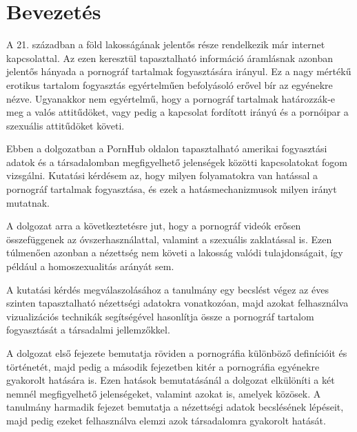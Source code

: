 \documentclass[12pt,a4paper]{article}
\begin{document}
\thispagestyle{empty}

\pagebreak

\tableofcontents

\thispagestyle{empty}

\pagebreak
\setcounter{page}{1}
\listoffigures


\pagebreak

\setcounter{tocdepth}{2}

\section{Bevezetés}

A 21. században a föld lakosságának jelentős része rendelkezik már internet kapcsolattal. Az ezen keresztül tapasztalható információ áramlásnak azonban jelentős hányada a pornográf tartalmak fogyasztására irányul. Ez a nagy mértékű erotikus tartalom fogyasztás egyértelműen befolyásoló erővel bír az egyénekre nézve. Ugyanakkor nem egyértelmű, hogy a pornográf tartalmak határozzák-e meg a valós attitűdöket, vagy pedig a kapcsolat fordított irányú és a pornóipar a szexuális attitűdöket követi.

Ebben a dolgozatban a PornHub oldalon tapasztalható amerikai fogyasztási adatok és a társadalomban megfigyelhető jelenségek közötti kapcsolatokat fogom vizsgálni. Kutatási kérdésem az, hogy milyen folyamatokra van hatással a pornográf tartalmak fogyasztása, és ezek a hatásmechanizmusok milyen irányt mutatnak.

A dolgozat arra a következtetésre jut, hogy a pornográf videók erősen összefüggenek az óvszerhasználattal, valamint a szexuális zaklatással is. Ezen túlmenően azonban a nézettség nem követi a lakosság valódi tulajdonságait, így például a homoszexualitás arányát sem.

A kutatási kérdés megválaszolásához a tanulmány egy becslést végez az éves szinten tapasztalható nézettségi adatokra vonatkozóan, majd azokat felhasználva vizualizációs technikák segítségével hasonlítja össze a pornográf tartalom fogyasztását a társadalmi jellemzőkkel.

A dolgozat első fejezete bemutatja röviden a pornográfia különböző definícióit és történetét, majd pedig a második fejezetben kitér a pornográfia egyénekre gyakorolt hatására is. Ezen hatások bemutatásánál a dolgozat elkülöníti a két nemnél megfigyelhető jelenségeket, valamint azokat is, amelyek közösek. A tanulmány harmadik fejezet bemutatja a nézettségi adatok becslésének lépéseit, majd pedig ezeket felhasználva elemzi azok társadalomra gyakorolt hatását. 
\end{document}
